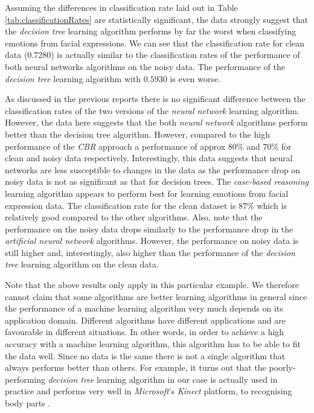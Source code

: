 \documentclass[10pt,a4paper]{article}
\begin{document}
Assuming the differences in classification rate laid out in Table \ref{tab:classificationRates} are statistically significant, the data strongly suggest that the \emph{decision tree} learning algorithm performs by far the worst when classifying emotions from facial expressions. We can see that the classification rate for clean data ($0.7280$) is actually similar to the classification rates of the performance of both neural networks algorithms on the noisy data. The performance of the \emph{decision tree} learning algorithm with $0.5930$ is even worse.

As discussed in the previous reports there is no significant difference between the classification rates of the two versions of the \emph{neural network} learning algorithm. However, the data here suggests that the both \emph{neural network} algorithms perform better than the decision tree algorithm. However, compared to the high performance of the \emph{CBR} approach a performance of approx $80\%$ and $70\%$ for clean and noisy data respectively. Interestingly, this data suggests that neural networks are less susceptible to changes in the data as the performance drop on noisy data is not as significant as that for decision trees. The \emph{case-based reasoning} learning algorithm appears to perform best for learning emotions from facial expression data. The classification rate for the clean dataset is $87\%$ which is relatively good compared to the other algorithms. Also, note that the performance on the noisy data drops similarly to the performance drop in the \emph{artificial neural network} algorithms. However, the performance on noisy data is still higher and, interestingly, also higher than the performance of the \emph{decision tree} learning algorithm on the clean data.

Note that the above results only apply in this particular example. We therefore cannot claim that some algorithms are better learning algorithms in general since the performance of a machine learning algorithm very much depends on its application domain. Different algorithms have different applications and are favourable in different situations. In other words, in order to achieve a high accuracy with a machine learning algorithm, this algorithm has to be able to fit the data well. Since no data is the same there is not a single algorithm that always performs better than others. For example, it turns out that the poorly-performing \emph{decision tree} learning algorithm in our case is actually used in practice and performs very well in \emph{Microsoft}'s \emph{Kinect} platform, to recognising body parts \cite{Shotton2011}.
\end{document}
